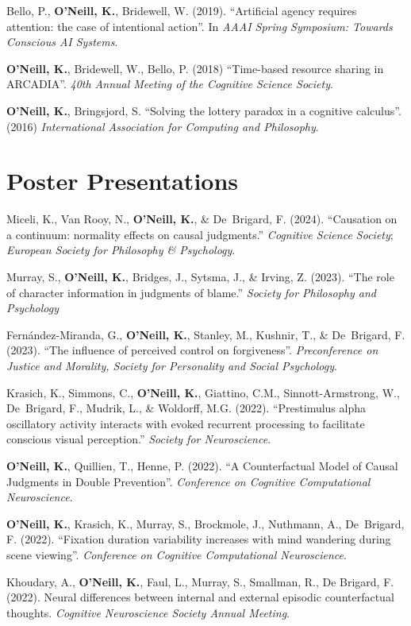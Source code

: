 Bello, P., \textbf{O'Neill, K.}, Bridewell, W. (2019). ``Artificial
agency requires attention: the case of intentional action''. In
\emph{AAAI Spring Symposium: Towards Conscious AI Systems}.

\textbf{O'Neill, K.}, Bridewell, W., Bello, P. (2018) ``Time-based
resource sharing in ARCADIA''. \emph{40th Annual Meeting of the
Cognitive Science Society}.

\textbf{O’Neill, K.}, Bringsjord, S. ``Solving the lottery paradox in
a cognitive calculus''. (2016) \emph{International Association for
Computing and Philosophy}.

\line\section{Poster Presentations}

Miceli, K., Van Rooy, N., \textbf{O'Neill, K.}, \& De~Brigard,
F. (2024). ``Causation on a continuum: normality effects on causal
judgments.'' \emph{Cognitive Science Society}; \emph{European Society
for Philosophy \& Psychology}.

Murray, S., \textbf{O’Neill, K.}, Bridges, J., Sytsma, J., \& Irving,
Z. (2023). ``The role of character information in judgments of
blame.'' \emph{Society for Philosophy and Psychology}

Fern\'{a}ndez-Miranda, G., \textbf{O’Neill, K.}, Stanley, M., Kushnir,
T., \& De~Brigard, F. (2023). ``The influence of perceived control on
forgiveness''. \emph{Preconference on Justice and Morality, Society
for Personality and Social Psychology}.

Krasich, K., Simmons, C., \textbf{O'Neill, K.}, Giattino, C.M.,
Sinnott-Armstrong, W., De~Brigard, F., Mudrik, L., \& Woldorff,
M.G. (2022). ``Prestimulus alpha oscillatory activity interacts with
evoked recurrent processing to facilitate conscious visual
perception.'' \emph{Society for Neuroscience}.

\textbf{O'Neill, K.}, Quillien, T., Henne, P. (2022). ``A
Counterfactual Model of Causal Judgments in Double
Prevention''. \emph{Conference on Cognitive Computational
Neuroscience}.

\textbf{O'Neill, K.}, Krasich, K., Murray, S., Brockmole, J.,
Nuthmann, A., De~Brigard, F. (2022). ``Fixation duration variability
increases with mind wandering during scene viewing''. \emph{Conference
on Cognitive Computational Neuroscience}.

Khoudary, A., \textbf{O’Neill, K.}, Faul, L., Murray, S., Smallman,
R., De Brigard, F. (2022). Neural differences between internal and
external episodic counterfactual thoughts. \emph{Cognitive
Neuroscience Society Annual Meeting}.

